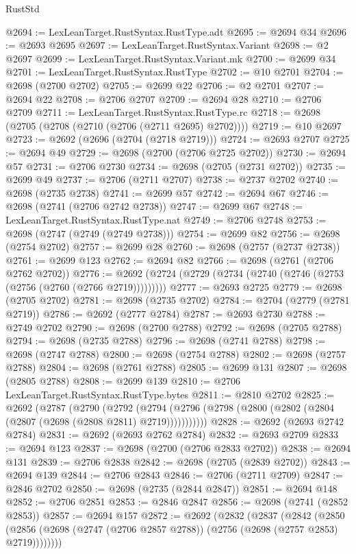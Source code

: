 \begin{lexlean}{RustStd}
\begin{coremodule}
@2694 := LexLeanTarget.RustSyntax.RustType.adt
@2695 := @2694 @34
@2696 := @2693 @2695
@2697 := LexLeanTarget.RustSyntax.Variant
@2698 := @2 @2697
@2699 := LexLeanTarget.RustSyntax.Variant.mk
@2700 := @2699 @34
@2701 := LexLeanTarget.RustSyntax.RustType
@2702 := @10 @2701
@2704 := @2698 (@2700 @2702)
@2705 := @2699 @22
@2706 := @2 @2701
@2707 := @2694 @22
@2708 := @2706 @2707
@2709 := @2694 @28
@2710 := @2706 @2709
@2711 := LexLeanTarget.RustSyntax.RustType.rc
@2718 := @2698 (@2705 (@2708 (@2710 (@2706 (@2711 @2695) @2702))))
@2719 := @10 @2697
@2723 := @2692 (@2696 (@2704 (@2718 @2719)))
@2724 := @2693 @2707
@2725 := @2694 @49
@2729 := @2698 (@2700 (@2706 @2725 @2702))
@2730 := @2694 @57
@2731 := @2706 @2730
@2734 := @2698 (@2705 (@2731 @2702))
@2735 := @2699 @49
@2737 := @2706 (@2711 @2707)
@2738 := @2737 @2702
@2740 := @2698 (@2735 @2738)
@2741 := @2699 @57
@2742 := @2694 @67
@2746 := @2698 (@2741 (@2706 @2742 @2738))
@2747 := @2699 @67
@2748 := LexLeanTarget.RustSyntax.RustType.nat
@2749 := @2706 @2748
@2753 := @2698 (@2747 (@2749 (@2749 @2738)))
@2754 := @2699 @82
@2756 := @2698 (@2754 @2702)
@2757 := @2699 @28
@2760 := @2698 (@2757 (@2737 @2738))
@2761 := @2699 @123
@2762 := @2694 @82
@2766 := @2698 (@2761 (@2706 @2762 @2702))
@2776 := @2692 (@2724 (@2729 (@2734 (@2740 (@2746 (@2753 (@2756 (@2760 (@2766 @2719)))))))))
@2777 := @2693 @2725
@2779 := @2698 (@2705 @2702)
@2781 := @2698 (@2735 @2702)
@2784 := @2704 (@2779 (@2781 @2719))
@2786 := @2692 (@2777 @2784)
@2787 := @2693 @2730
@2788 := @2749 @2702
@2790 := @2698 (@2700 @2788)
@2792 := @2698 (@2705 @2788)
@2794 := @2698 (@2735 @2788)
@2796 := @2698 (@2741 @2788)
@2798 := @2698 (@2747 @2788)
@2800 := @2698 (@2754 @2788)
@2802 := @2698 (@2757 @2788)
@2804 := @2698 (@2761 @2788)
@2805 := @2699 @131
@2807 := @2698 (@2805 @2788)
@2808 := @2699 @139
@2810 := @2706 LexLeanTarget.RustSyntax.RustType.bytes
@2811 := @2810 @2702
@2825 := @2692
    (@2787
      (@2790
        (@2792
          (@2794 (@2796 (@2798 (@2800 (@2802 (@2804 (@2807 (@2698 (@2808 @2811) @2719)))))))))))
@2828 := @2692 (@2693 @2742 @2784)
@2831 := @2692 (@2693 @2762 @2784)
@2832 := @2693 @2709
@2833 := @2694 @123
@2837 := @2698 (@2700 (@2706 @2833 @2702))
@2838 := @2694 @131
@2839 := @2706 @2838
@2842 := @2698 (@2705 (@2839 @2702))
@2843 := @2694 @139
@2844 := @2706 @2843
@2846 := @2706 (@2711 @2709)
@2847 := @2846 @2702
@2850 := @2698 (@2735 (@2844 @2847))
@2851 := @2694 @148
@2852 := @2706 @2851
@2853 := @2846 @2847
@2856 := @2698 (@2741 (@2852 @2853))
@2857 := @2694 @157
@2872 := @2692
    (@2832
      (@2837
        (@2842
          (@2850 (@2856 (@2698 (@2747 (@2706 @2857 @2788)) (@2756 (@2698 (@2757 @2853) @2719))))))))

\end{coremodule}
\end{lexlean}
